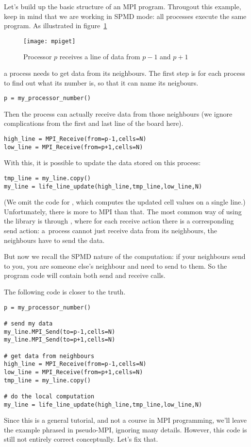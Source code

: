 Let's build up the basic structure of an MPI program. 
Througout this example, keep in mind that we are working in \ac{SPMD} mode:
all processes execute the same program.
As illustrated in figure~\ref{fig:mpiget}
\begin{figure}[t]
  \texttt{[image: mpiget]}
  \caption{Processor $p$ receives a line of data from $p-1$ and $p+1$}
  \label{fig:mpiget}
\end{figure}
a process needs to get data from its neighbours. 
The first step is for each process to find out what its number is,
so that it can name its neigbours.
\begin{verbatim}
p = my_processor_number()
\end{verbatim}
Then the process can actually receive data from those neighbours
(we ignore complications from the first and last line of the board here).
\begin{verbatim}
high_line = MPI_Receive(from=p-1,cells=N)
low_line = MPI_Receive(from=p+1,cells=N)
\end{verbatim}
With this, it is possible to update the data stored on this process:
\begin{verbatim}
tmp_line = my_line.copy()
my_line = life_line_update(high_line,tmp_line,low_line,N)
\end{verbatim}
(We omit the code for , which computes the updated
cell values on a single line.)
Unfortunately, there is more to MPI than that. The most common way
of using the library is through ,
where for each receive action there is a corresponding send action:
a~process cannot just receive data from its neighbours, the neighbours
have to send the data.

But now we recall the \ac{SPMD} nature of the computation: 
if your neighbours send to you, you are someone else's neighbour and
need to send to them. So the program code will contain both
send and receive calls.

The following code is closer to the truth.
\begin{verbatim}
p = my_processor_number()

# send my data
my_line.MPI_Send(to=p-1,cells=N)
my_line.MPI_Send(to=p+1,cells=N)

# get data from neighbours
high_line = MPI_Receive(from=p-1,cells=N)
low_line = MPI_Receive(from=p+1,cells=N)
tmp_line = my_line.copy()

# do the local computation
my_line = life_line_update(high_line,tmp_line,low_line,N)
\end{verbatim}
Since this is a general tutorial, and not a course in MPI programming,
we'll leave the example phrased in pseudo-MPI, ignoring many details.
However, this code is still not entirely
correct conceptually. Let's fix that.

